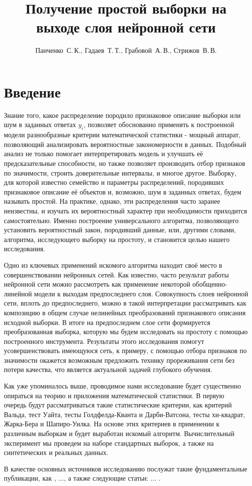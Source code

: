 \documentclass[12pt,twoside]{article}
\title
    [Получение простой выборки на выходе слоя нейронной сети] %
    {Получение простой выборки на выходе слоя нейронной сети}
\author
    [Панченко~С.\,К.] %
    {Панченко~С.\,К., Гадаев~Т.\,Т., Грабовой~А.\,В., Стрижов~В.\,В.} %
    [Панченко~С.\,К.$^1$, Гадаев~Т.\,Т.$^1$, Грабовой~А.\,В.$^1$, Стрижов~В.\,В.] %
\begin{document}
\maketitle
\section{Введение}
Знание того, какое распределение породило признаковое описание выборки или шум в заданных ответах $y_i$, позволяет обоснованно применять к построенной модели разнообразные критерии математической статистики - мощный аппарат, позволяющий анализировать вероятностные закономерности в данных. Подобный анализ не только помогает интерпретировать модель и улучшать её предсказательные способности, но также позволяет производить отбор признаков по значимости, строить доверительные интервалы, и многое другое. Выборку, для которой известно семейство и параметры распределений, породивших признаковое описание её объектов и, возможно, шум в заданных ответах, будем называть простой. На практике, однако, эти распределения часто заранее неизвестны, и изучать их вероятностный характер при необходимости приходится самостоятельно. Именно построение универсального алгоритма, позволяющего установить вероятностный закон, породивший данные, или, другими словами, алгоритма, исследующего выборку на простоту, и становится целью нашего исследования. \par
Одно из ключевых применений искомого алгоритма находит своё место в совершенствовании нейронных сетей. Как известно, часто результат работы нейронной сети можно рассмотреть как применение некоторой обобщенно-линейной модели к выходам предпоследнего слоя. Совокупность слоев нейронной сети, вплоть до предпоследнего, можно в такой интерпретации рассматривать как композицию в общем случае нелинейных преобразований признакового описания исходной выборки. В итоге на предпоследнем слое сети формируется преобразованная выборка, которую мы будем исследовать на простоту с помощью построенного инструмента. Результаты этого исследования помогут усовершенствовать имеющуюся сеть, к примеру, с помощью отбора признаков по значимости окажется возможным предложить технику прореживания сети без потери качества, что является актуальной задачей глубокого обучения. \par
Как уже упоминалось выше, проводимое нами исследование будет существенно опираться на теорию и приложения математической статистики. В первую очередь будут рассматриваться такие статистические критерии, как критерий Вальда, тест Уайта, тесты Голдфелда-Кванта и Дарби-Ватсона, тесты хи-квадрат, Жарка-Бера и Шапиро-Уилка. На основе этих критериев в применении к различным выборкам и будет выработан искомый алгоритм. Вычислительный эксперимент мы проведем на наборе стандартных выборок, а также на синтетических и реальных данных. \par
В качестве основных источников исследованию послужат такие фундаментальные публикации, как \cite{books/lib/Bishop07}, ..., а также следующие статьи: ... .
\end{document}
